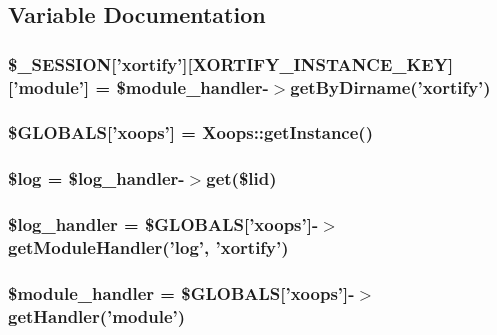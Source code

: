\subsection{Variable Documentation}
\hypertarget{banned_8php_abe1e967dbf87a7b078bc37e6b4803e04}{
\subsubsection[{\$\-\_\-\-S\-E\-S\-S\-I\-O\-N}]{\setlength{\rightskip}{0pt plus 5cm}\$\-\_\-\-S\-E\-S\-S\-I\-O\-N\mbox{[}'xortify'\mbox{]}\mbox{[}{\bf X\-O\-R\-T\-I\-F\-Y\-\_\-\-I\-N\-S\-T\-A\-N\-C\-E\-\_\-\-K\-E\-Y}\mbox{]}\mbox{[}'module'\mbox{]} = \$module\-\_\-handler-\/$>$get\-By\-Dirname('xortify')}}\label{banned_8php_abe1e967dbf87a7b078bc37e6b4803e04}
\hypertarget{banned_8php_ad10934112c0d18cf6b358d47afa6fcf1}{
\subsubsection[{\$\-G\-L\-O\-B\-A\-L\-S}]{\setlength{\rightskip}{0pt plus 5cm}\$G\-L\-O\-B\-A\-L\-S\mbox{[}'xoops'\mbox{]} = Xoops\-::get\-Instance()}}\label{banned_8php_ad10934112c0d18cf6b358d47afa6fcf1}
\hypertarget{banned_8php_a9a2cf15a653aee8be437f7ae474cd494}{
\subsubsection[{\$log}]{\setlength{\rightskip}{0pt plus 5cm}\$log = \$log\-\_\-handler-\/$>$get(\$lid)}}\label{banned_8php_a9a2cf15a653aee8be437f7ae474cd494}
\hypertarget{banned_8php_a57087b1c7fc5b4ecf0edf917f6c40b71}{
\subsubsection[{\$log\-\_\-handler}]{\setlength{\rightskip}{0pt plus 5cm}\$log\-\_\-handler = \$G\-L\-O\-B\-A\-L\-S\mbox{[}'xoops'\mbox{]}-\/$>$get\-Module\-Handler('log', 'xortify')}}\label{banned_8php_a57087b1c7fc5b4ecf0edf917f6c40b71}
\hypertarget{banned_8php_afe9169534dbc3935c0823c21cfbf68bb}{
\subsubsection[{\$module\-\_\-handler}]{\setlength{\rightskip}{0pt plus 5cm}\$module\-\_\-handler = \$G\-L\-O\-B\-A\-L\-S\mbox{[}'xoops'\mbox{]}-\/$>$get\-Handler('module')}}\label{banned_8php_afe9169534dbc3935c0823c21cfbf68bb}
